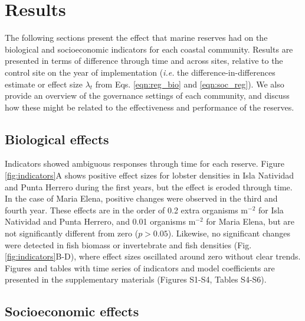 \documentclass{frontiersSCNS}
\begin{document}
\hypertarget{results}{%
\section{Results}\label{results}}

The following sections present the effect that marine reserves had on the biological and socioeconomic indicators for each coastal community. Results are presented in terms of difference through time and across sites, relative to the control site on the year of implementation (\emph{i.e.} the difference-in-differences estimate or effect size \(\lambda_t\) from Eqs. \ref{eqn:reg_bio} and \ref{eqn:soc_reg}). We also provide an overview of the governance settings of each community, and discuss how these might be related to the effectiveness and performance of the reserves.

\hypertarget{biological-effects}{%
\subsection{Biological effects}\label{biological-effects}}

Indicators showed ambiguous responses through time for each reserve. Figure \ref{fig:indicators}A shows positive effect sizes for lobster densities in Isla Natividad and Punta Herrero during the first years, but the effect is eroded through time. In the case of Maria Elena, positive changes were observed in the third and fourth year. These effects are in the order of 0.2 extra organisms \(\mathrm{m}^{-2}\) for Isla Natividad and Punta Herrero, and 0.01 organisms \(\mathrm{m}^{-2}\) for Maria Elena, but are not significantly different from zero (\(p > 0.05\)). Likewise, no significant changes were detected in fish biomass or invertebrate and fish densities (Fig. \ref{fig:indicators}B-D), where effect sizes oscillated around zero without clear trends. Figures and tables with time series of indicators and model coefficients are presented in the supplementary materials (Figures S1-S4, Tables S4-S6).

\hypertarget{socioeconomic-effects}{%
\subsection{Socioeconomic effects}\label{socioeconomic-effects}}
\end{document}
